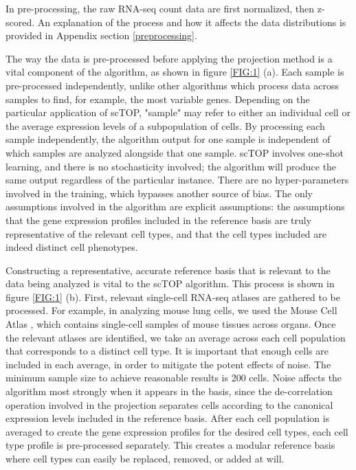 \documentclass[aps,superscriptaddress, notitlepage,longbibliography]{revtex4-1}
\begin{document}
In pre-processing, the raw RNA-seq count data are first normalized, then z-scored. An explanation of the process and how it affects the data distributions is provided in Appendix section \ref{preprocessing}.

The way the data is pre-processed before applying the projection method is a vital component of the algorithm, as shown in figure \ref{FIG:1} (a). Each sample is pre-processed independently, unlike other algorithms which process data across samples to find, for example, the most variable genes. Depending on the particular application of scTOP, "sample" may refer to either an individual cell or the average expression levels of a subpopulation of cells. By processing each sample independently, the algorithm output for one sample is independent of which samples are analyzed alongside that one sample. scTOP involves one-shot learning, and there is no stochasticity involved; the algorithm will produce the same output regardless of the particular instance. There are no hyper-parameters involved in the training, which bypasses another source of bias. The only assumptions involved in the algorithm are explicit assumptions: the assumptions that the gene expression profiles included in the reference basis are truly representative of the relevant cell types, and that the cell types included are indeed distinct cell phenotypes.

Constructing a representative, accurate reference basis that is relevant to the data being analyzed is vital to the scTOP algorithm. This process is shown in figure \ref{FIG:1} (b). First, relevant single-cell RNA-seq atlases are gathered to be processed. For example, in analyzing mouse lung cells, we used the Mouse Cell Atlas , which contains single-cell samples of mouse tissues across  organs. Once the relevant atlases are identified, we take an average across each cell population that corresponds to a distinct cell type. It is important that enough cells are included in each average, in order to mitigate the potent effects of noise. The minimum sample size to achieve reasonable results is 200 cells. Noise affects the algorithm most strongly when it appears in the basis, since the de-correlation operation involved in the projection separates cells according to the canonical expression levels included in the reference basis.  After each cell population is averaged to create the gene expression profiles for the desired cell types, each cell type profile is pre-processed separately. This creates a modular reference basis where cell types can easily be replaced, removed, or added at will. 
\end{document}
